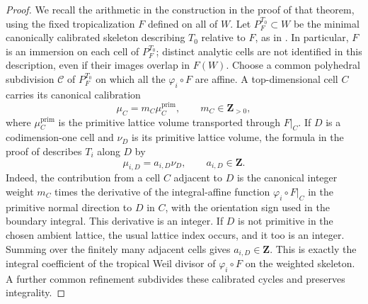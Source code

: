 \begin{proof}
We recall the arithmetic in the construction in the proof of that theorem,
using the fixed tropicalization $F$ defined on all of $W$.  Let
$P_F^{T_0}\subset W$ be the minimal
canonically calibrated skeleton describing $T_0$ relative to $F$, as in
\cite[Propositions~7.5.7--7.5.8]{CLD25}.  In particular, $F$ is an immersion
on each cell of $P_F^{T_0}$; distinct analytic cells are not identified in
this description, even if their images overlap in $F(W)$.  Choose a common
polyhedral subdivision $\mathscr C$ of $P_F^{T_0}$ on which all the
$\varphi_i\circ F$ are affine.  A top-dimensional cell $C$ carries its
canonical calibration
\[
                         \mu_C=m_C\mu_C^{\mathrm{prim}},
                         \qquad m_C\in\mathbf Z_{>0},
\]
where $\mu_C^{\mathrm{prim}}$ is the primitive lattice volume transported
through $F|_C$.  If $D$ is a codimension-one cell and $\nu_D$ is its
primitive lattice volume, the formula in the proof of
\cite[Theorem~8.10.3]{CLD25} describes $T_i$ along $D$ by
\begin{equation}
\label{eq:ch18-zero-current-calibration}
                         \mu_{i,D}=a_{i,D}\nu_D,
                         \qquad a_{i,D}\in\mathbf Z.
\end{equation}
Indeed, the contribution from a cell $C$ adjacent to $D$ is the canonical
integer weight $m_C$ times the derivative of the integral-affine function
$\varphi_i\circ F|_C$ in the primitive normal direction to $D$ in $C$, with
the orientation sign used in the boundary integral.  This derivative is an
integer.  If $D$ is not primitive in the chosen ambient lattice, the usual
lattice index occurs, and it too is an integer.  Summing over the finitely
many adjacent cells gives $a_{i,D}\in\mathbf Z$.  This is exactly the
integral coefficient of the tropical Weil divisor of $\varphi_i\circ F$ on
the weighted skeleton.  A further common refinement subdivides these
calibrated cycles and preserves integrality.


\end{proof}

